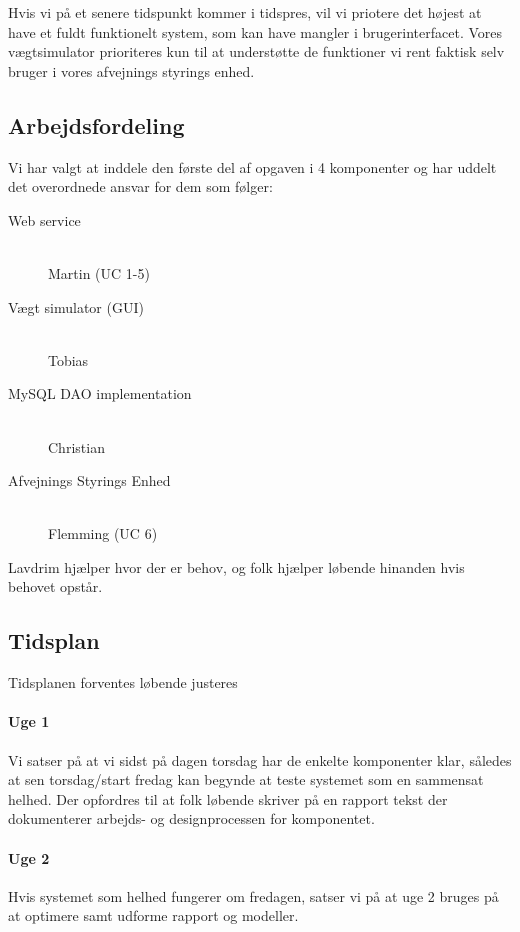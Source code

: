 \documentclass[a4paper]{article}
\begin{document}
Hvis vi på et senere tidspunkt kommer i tidspres, vil vi priotere det højest at have et fuldt funktionelt system, som kan have mangler i brugerinterfacet. Vores vægtsimulator prioriteres kun til at understøtte de funktioner vi rent faktisk selv bruger i vores afvejnings styrings enhed.


\subsection{Arbejdsfordeling} %
\label{sub:Arbejdsfordeling}

Vi har valgt at inddele den første del af opgaven i 4 komponenter og har uddelt det overordnede ansvar for dem som følger:

\begin{description}
  \item[Web service]\hfill
    \\Martin (UC 1-5)
  \item[Vægt simulator (GUI)]\hfill
    \\Tobias
  \item[MySQL DAO implementation]\hfill
    \\Christian
  \item[Afvejnings Styrings Enhed]\hfill
    \\Flemming (UC 6)
\end{description}

Lavdrim hjælper hvor der er behov, og folk hjælper løbende hinanden hvis behovet opstår.


\subsection{Tidsplan} %
\label{sub:Tidsplan}

Tidsplanen forventes løbende justeres

\paragraph{Uge 1} %
\label{par:Uge 1}

Vi satser på at vi sidst på dagen torsdag har de enkelte komponenter klar, således at sen torsdag/start fredag kan begynde at teste systemet som en sammensat helhed. Der opfordres til at folk løbende skriver på en rapport tekst der dokumenterer arbejds- og designprocessen for komponentet.


\paragraph{Uge 2} %
\label{par:Uge 2}

Hvis systemet som helhed fungerer om fredagen, satser vi på at uge 2 bruges på at optimere samt udforme rapport og modeller. 



\end{document}
